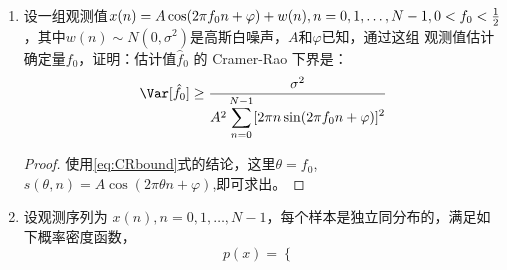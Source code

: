 \documentclass{article}
\begin{document}
\begin{enumerate}
\begin{equation}\label{eq:CRbound}
\Var[\hat{\theta}] \geq \frac{\sigma^2}{\sum_{n=0}^{N-1} \left(\frac{\partial s(n,\theta)}{\partial \theta}\right)^2}
\end{equation}
\begin{proof}
利用克拉美罗界的性质，只需求解参数$\theta$的Fisher 信息。
由Fisher 信息的公式
\begin{equation}
I(\theta)=-E(\frac{\partial^2 \log(p(\bm{x},\theta))}{\partial \theta^2})
\end{equation}
首先求随机变量$X$的概率密度函数, 是均值为$s(n,\theta)$,方差为$\sigma^2$的高斯分布的概率密度函数的乘积，因此其
对数似然函数为：
\begin{equation}
\log(p(\bm{x},\theta))=-\frac{N}{2}\log(2\pi \sigma^2)-\sum_{n=0}^{N-1} \frac{(x_n-s(n,\theta))^2}{2\sigma^2}
\end{equation}
因此
\begin{align}
I(\theta)= &\frac{1}{\sigma^2}\sum_{n=0}^{N-1}\E\left[ \biggl(s(n,\theta)-x_n\biggr)\frac{\partial^2 s(n,\theta)}{\partial \theta^2}+\left(\frac{\partial s(n,\theta)}{\partial \theta}\right)^2\right]\\
=& \sum_{n=0}^{N-1}\frac{1}{\sigma^2}\left(\frac{\partial s(n,\theta)}{\partial \theta}\right)^2
\end{align}
最后我们得到
\begin{align}
\Var(\hat{\theta})\geq &\frac{1}{I(\theta)}\\
=& \frac{\sigma^2}{\displaystyle\left(\frac{\partial s(n,\theta)}{\partial \theta}\right)^2}
\end{align}
\end{proof}
\item
设一组观测值$x(n) = A\cos(2\pi f_0 n + \varphi) + w(n),n=0,1,\dots,N-1,0<f_0 <{1\over 2}$，其中$w(n)\sim N(0,\sigma^2)$是高斯白噪声，$A$和$\varphi$已知，通过这组
观测值估计确定量$f_0$，证明：估计值$\hat{f}_0$ 的 Cramer-Rao 下界是：
\begin{equation}
\Var[\hat{f}_0]\geq \frac{\sigma^2}{A^2\displaystyle\sum_{n=0}^{N-1} [2\pi n \sin(2\pi f_0 n + \varphi)]^2}
\end{equation}
\begin{proof}
使用\eqref{eq:CRbound}式的结论，这里$\theta=f_0$,$s(\theta,n)=A\cos(2\pi \theta n+ \varphi)$,即可求出。
\end{proof}
\item
设观测序列为 $x(n),n=0,1,\dots,N-1$，每个样本是独立同分布的，满足如下概率密度函数，
$$
p(x) = \begin{cases} 

\end{cases}$$
\end{enumerate}
\end{document}
